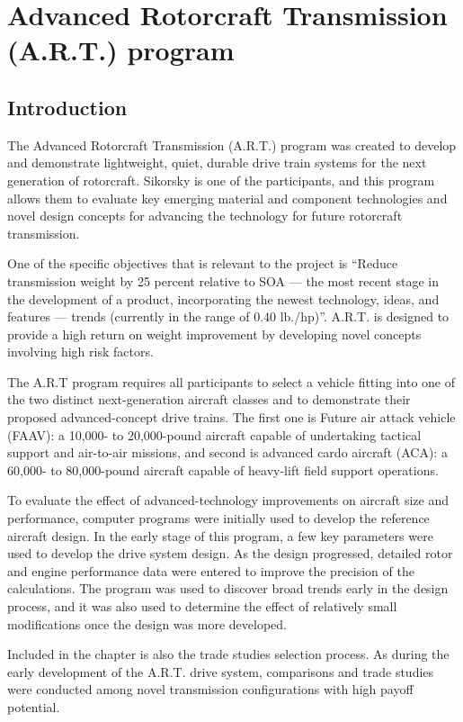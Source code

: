 \chapter{Advanced Rotorcraft Transmission (A.R.T.) program}
\section{Introduction}
	The Advanced Rotorcraft Transmission (A.R.T.) program was created to develop and demonstrate lightweight, 
	quiet, durable drive train systems for the next generation of rotorcraft. Sikorsky is one of the participants, 
	and this program allows them to evaluate key emerging material and component technologies and novel design 
	concepts for advancing the technology for future rotorcraft transmission.  

	One of the specific objectives that is relevant to the project is “Reduce transmission weight by 25 percent 
	relative to SOA — the most recent stage in the development of a product, incorporating the newest technology, 
	ideas, and features — trends (currently in the range of 0.40 lb./hp)”. A.R.T. is designed to provide a high 
	return on weight improvement by developing novel concepts involving high risk factors. 

	The A.R.T program requires all participants to select a vehicle fitting into one of the two distinct 
	next-generation aircraft classes and to demonstrate their proposed advanced-concept drive trains. The first one 
	is Future air attack vehicle (FAAV): a 10,000- to 20,000-pound aircraft capable of undertaking tactical support 
	and air-to-air missions, and second is advanced cardo aircraft (ACA): a 60,000- to 80,000-pound aircraft 
	capable of heavy-lift field support operations. 

	To evaluate the effect of advanced-technology improvements on aircraft size and performance, computer 
	programs were initially used to develop the reference aircraft design. In the early stage of this program, 
	a few key parameters were used to develop the drive system design. As the design progressed, detailed rotor 
	and engine performance data were entered to improve the precision of the calculations. The program was used to 
	discover broad trends early in the design process, and it was also used to determine the effect of relatively 
	small modifications once the design was more developed. 

	Included in the chapter is also the trade studies selection process. As during the early development of the 
	A.R.T. drive system, comparisons and trade studies were conducted among novel transmission configurations with 
	high payoff potential. 

